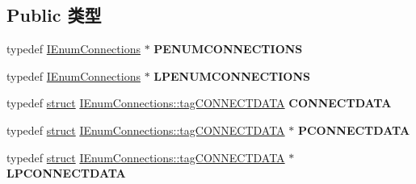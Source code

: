 \subsection*{Public 类型}
\begin{DoxyCompactItemize}
\item 
\mbox{\label{interface_i_enum_connections_a315d191dbdbeb3dd8e1dee020fd55ce6}} 
typedef \hyperlink{interface_i_enum_connections}{I\+Enum\+Connections} $\ast$ {\bfseries P\+E\+N\+U\+M\+C\+O\+N\+N\+E\+C\+T\+I\+O\+NS}
\item 
\mbox{\label{interface_i_enum_connections_a04659bb51898532f5c002afc9d44c303}} 
typedef \hyperlink{interface_i_enum_connections}{I\+Enum\+Connections} $\ast$ {\bfseries L\+P\+E\+N\+U\+M\+C\+O\+N\+N\+E\+C\+T\+I\+O\+NS}
\item 
\mbox{\label{interface_i_enum_connections_a818be65cb81f2e294f0eeda0e585204d}} 
typedef \hyperlink{interfacestruct}{struct} \hyperlink{struct_i_enum_connections_1_1tag_c_o_n_n_e_c_t_d_a_t_a}{I\+Enum\+Connections\+::tag\+C\+O\+N\+N\+E\+C\+T\+D\+A\+TA} {\bfseries C\+O\+N\+N\+E\+C\+T\+D\+A\+TA}
\item 
\mbox{\label{interface_i_enum_connections_aee7290f3b9e640aed902eab6437cb948}} 
typedef \hyperlink{interfacestruct}{struct} \hyperlink{struct_i_enum_connections_1_1tag_c_o_n_n_e_c_t_d_a_t_a}{I\+Enum\+Connections\+::tag\+C\+O\+N\+N\+E\+C\+T\+D\+A\+TA} $\ast$ {\bfseries P\+C\+O\+N\+N\+E\+C\+T\+D\+A\+TA}
\item 
\mbox{\label{interface_i_enum_connections_a5d9eb592ba1d703e814326c53347ea31}} 
typedef \hyperlink{interfacestruct}{struct} \hyperlink{struct_i_enum_connections_1_1tag_c_o_n_n_e_c_t_d_a_t_a}{I\+Enum\+Connections\+::tag\+C\+O\+N\+N\+E\+C\+T\+D\+A\+TA} $\ast$ {\bfseries L\+P\+C\+O\+N\+N\+E\+C\+T\+D\+A\+TA}
\end{DoxyCompactItemize}
